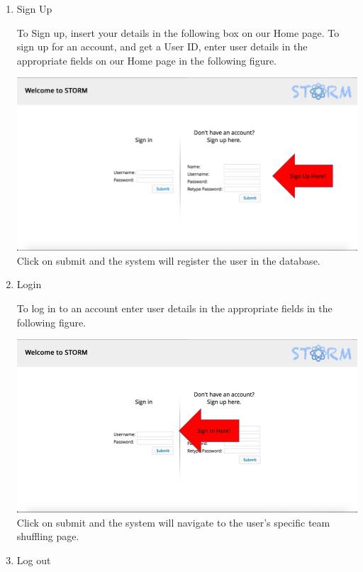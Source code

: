 \begin{enumerate}
\item Sign Up\par

To Sign up, insert your details in the following box on our Home page.
To sign up for an account, and get a User ID, enter user details in the appropriate fields on our Home page in the following figure.\par

\includegraphics[width=13cm]{./graphics/StormUMSU1.jpg}
Click on submit and the system will register the user in the database.

\item Login\par
To log in to an account enter user details in the appropriate fields in the following figure.\par
\includegraphics[width=13cm]{./graphics/StormUMSU2.jpg}
Click on submit and the system will navigate to the user's specific team shuffling page.

\item Log out\par
\end{enumerate}